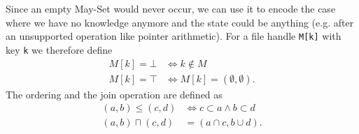 Since an empty May-Set would never occur, we can use it to encode the case where we have no knowledge anymore and the state could be anything (e.g. after an unsupported operation like pointer arithmetic).
For a file handle \verb|M[k]| with key \verb|k| we therefore define 
\begin{align}
M[k] = \bot &\Leftrightarrow k \notin M\\
M[k] = \top &\Leftrightarrow M[k] = (\emptyset, \emptyset).
\end{align}
The ordering and the join operation are defined as
\begin{align}
(a,b) \leq (c,d) &\Leftrightarrow c \subset a \wedge b \subset d\\
(a,b) \sqcap (c,d) &= (a \cap c, b \cup d).
\end{align}

%


